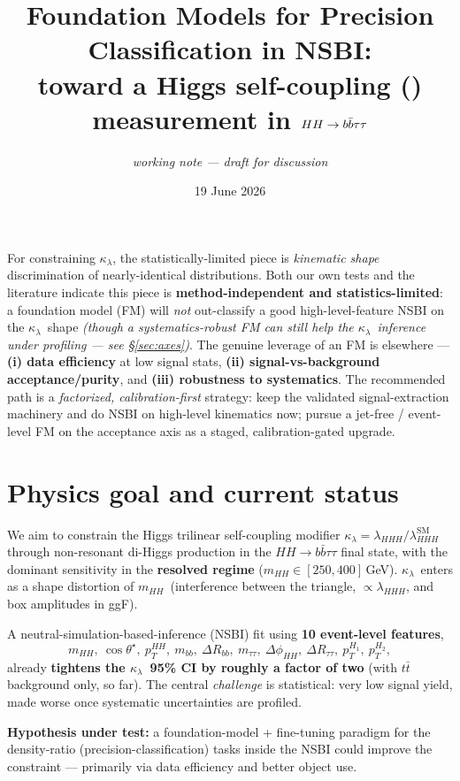 \documentclass[11pt]{article}
\title{\vspace{-2.5em}Foundation Models for Precision Classification in NSBI:\\
toward a Higgs self-coupling (\kl) measurement in $HH\to\bbtt$}
\author{\normalsize\itshape working note --- draft for discussion}
\date{19 June 2026}
\newcommand{\kl}{\ensuremath{\kappa_\lambda}}
\newcommand{\mhh}{\ensuremath{m_{HH}}}
\newcommand{\bbtt}{\ensuremath{b\bar b\tau\tau}}
\begin{document}
\maketitle
\vspace{-1.5em}

\begin{takeaway}
For constraining \kl, the statistically-limited piece is \emph{kinematic shape}
discrimination of nearly-identical distributions. Both our own tests and the
literature indicate this piece is \textbf{method-independent and statistics-limited}:
a foundation model (FM) will \emph{not} out-classify a good high-level-feature NSBI
on the \kl\ shape \emph{(though a systematics-robust FM can still help the \kl\
inference under profiling --- see \S\ref{sec:axes})}. The genuine leverage of an FM is
elsewhere ---
\textbf{(i) data efficiency} at low signal stats, \textbf{(ii) signal-vs-background
acceptance/purity}, and \textbf{(iii) robustness to systematics}. The recommended
path is a \emph{factorized, calibration-first} strategy: keep the validated
signal-extraction machinery and do NSBI on high-level kinematics now; pursue a
jet-free / event-level FM on the acceptance axis as a staged, calibration-gated
upgrade.
\end{takeaway}

\section{Physics goal and current status}
We aim to constrain the Higgs trilinear self-coupling modifier
$\kl=\lambda_{HHH}/\lambda_{HHH}^{\mathrm{SM}}$ through non-resonant di-Higgs
production in the $HH\to\bbtt$ final state, with the dominant sensitivity in the
\textbf{resolved regime} ($\mhh\in[250,400]\,$GeV). \kl\ enters as a shape
distortion of \mhh\ (interference between the triangle, $\propto\lambda_{HHH}$, and
box amplitudes in ggF).

A neutral-simulation-based-inference (NSBI) fit using \textbf{10 event-level features},
\[
\mhh,\ \cos\theta^\star,\ p_T^{HH},\ m_{bb},\ \Delta R_{bb},\ m_{\tau\tau},\
\Delta\phi_{HH},\ \Delta R_{\tau\tau},\ p_T^{H_1},\ p_T^{H_2},
\]
already \textbf{tightens the \kl\ 95\% CI by roughly a factor of two} (with $t\bar t$
background only, so far). The central \emph{challenge} is statistical: very low
signal yield, made worse once systematic uncertainties are profiled.

\textbf{Hypothesis under test:} a foundation-model + fine-tuning paradigm for the
density-ratio (precision-classification) tasks inside the NSBI could improve the
constraint --- primarily via data efficiency and better object use.
\end{document}
